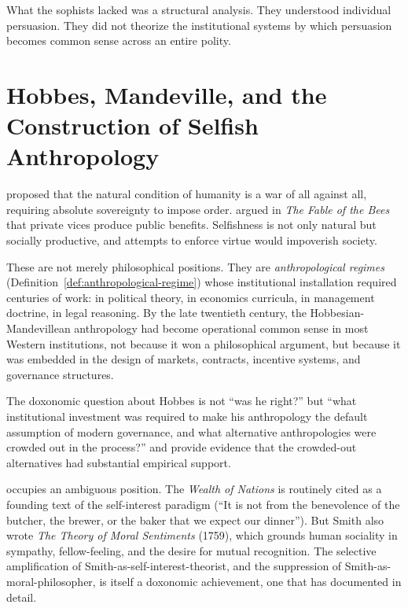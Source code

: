 What the sophists lacked was a structural analysis.
They understood individual persuasion.
They did not theorize the institutional systems by which persuasion becomes common sense across an entire polity.


\section{Hobbes, Mandeville, and the Construction of Selfish Anthropology}
\label{sec:ch3-hobbes}

\textcite{hobbes1651} proposed that the natural condition of humanity is a war of all against all, requiring absolute sovereignty to impose order.
\textcite{mandeville1714} argued in \textit{The Fable of the Bees} that private vices produce public benefits. Selfishness is not only natural but socially productive, and attempts to enforce virtue would impoverish society.

These are not merely philosophical positions.
They are \emph{anthropological regimes} (Definition~\ref{def:anthropological-regime}) whose institutional installation required centuries of work: in political theory, in economics curricula, in management doctrine, in legal reasoning.
By the late twentieth century, the Hobbesian-Mandevillean anthropology had become operational common sense in most Western institutions, not because it won a philosophical argument, but because it was embedded in the design of markets, contracts, incentive systems, and governance structures.

\begin{remark}
\label{rem:hobbes-doxonomic}
The doxonomic question about Hobbes is not ``was he right?'' but ``what institutional investment was required to make his anthropology the default assumption of modern governance, and what alternative anthropologies were crowded out in the process?''
\textcite{bowles2011} and \textcite{ostrom1990} provide evidence that the crowded-out alternatives had substantial empirical support.
\end{remark}

\textcite{smith1776} occupies an ambiguous position.
The \textit{Wealth of Nations} is routinely cited as a founding text of the self-interest paradigm (``It is not from the benevolence of the butcher, the brewer, or the baker that we expect our dinner'').
But Smith also wrote \textit{The Theory of Moral Sentiments} (1759), which grounds human sociality in sympathy, fellow-feeling, and the desire for mutual recognition.
The selective amplification of Smith-as-self-interest-theorist, and the suppression of Smith-as-moral-philosopher, is itself a doxonomic achievement, one that \textcite{mcCloskey2006} has documented in detail.


